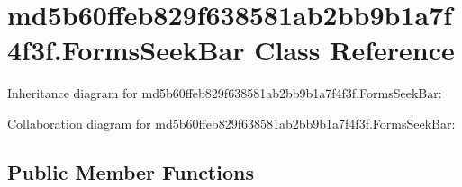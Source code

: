 \hypertarget{classmd5b60ffeb829f638581ab2bb9b1a7f4f3f_1_1_forms_seek_bar}{}\section{md5b60ffeb829f638581ab2bb9b1a7f4f3f.\+Forms\+Seek\+Bar Class Reference}
\label{classmd5b60ffeb829f638581ab2bb9b1a7f4f3f_1_1_forms_seek_bar}


Inheritance diagram for md5b60ffeb829f638581ab2bb9b1a7f4f3f.\+Forms\+Seek\+Bar\+:


Collaboration diagram for md5b60ffeb829f638581ab2bb9b1a7f4f3f.\+Forms\+Seek\+Bar\+:
\subsection*{Public Member Functions}
